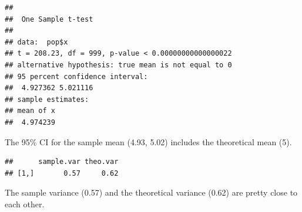 \documentclass[]{article}
\newenvironment{Shaded}{\begin{snugshade}}{\end{snugshade}}
\newcommand{\KeywordTok}[1]{\textcolor[rgb]{0.13,0.29,0.53}{\textbf{#1}}}
\newcommand{\DecValTok}[1]{\textcolor[rgb]{0.00,0.00,0.81}{#1}}
\newcommand{\StringTok}[1]{\textcolor[rgb]{0.31,0.60,0.02}{#1}}
\newcommand{\CommentTok}[1]{\textcolor[rgb]{0.56,0.35,0.01}{\textit{#1}}}
\newcommand{\OperatorTok}[1]{\textcolor[rgb]{0.81,0.36,0.00}{\textbf{#1}}}
\newcommand{\NormalTok}[1]{#1}
\begin{document}
\begin{verbatim}
## 
##  One Sample t-test
## 
## data:  pop$x
## t = 208.23, df = 999, p-value < 0.00000000000000022
## alternative hypothesis: true mean is not equal to 0
## 95 percent confidence interval:
##  4.927362 5.021116
## sample estimates:
## mean of x 
##  4.974239
\end{verbatim}

\begin{Shaded}
\end{Shaded}

The 95\% CI for the sample mean (4.93, 5.02) includes the theoretical
mean (5).

\begin{Shaded}
\end{Shaded}

\begin{verbatim}
##      sample.var theo.var
## [1,]       0.57     0.62
\end{verbatim}

The sample variance (0.57) and the theoretical variance (0.62) are
pretty close to each other.
\end{document}
